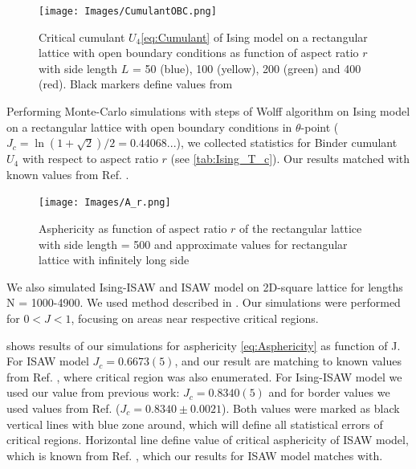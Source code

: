 \documentclass[a4paper]{jpconf}
\begin{document}
\begin{figure}[h]
    \centering
    \texttt{[image: Images/CumulantOBC.png]}
    \caption{Critical cumulant $U_{4}$\eqref{eq:Cumulant} of Ising model on a rectangular lattice with open boundary conditions as function of aspect ratio $r$ with side length $L$ = 50 (blue), 100 (yellow), 200 (green) and 400 (red). Black markers define values from \cite{Selke2006}}
    \label{fig:A_r}
\end{figure}

Performing Monte-Carlo simulations with steps of Wolff algorithm \cite{Newmanb1999} on Ising model on a rectangular lattice with open boundary conditions in $\theta$-point ($J_{c} = \ln{(1 + \sqrt{2}) / 2} =  0.44068... $), we collected statistics for Binder cumulant $U_{4}$ with respect to aspect ratio $r$ (see \cref{tab:Ising_T_c}). Our results matched with known values from Ref. \cite{Selke2006}.

\begin{figure}[h]
    \centering
    \texttt{[image: Images/A\_r.png]}
    \caption{Asphericity as function of aspect ratio $r$ of the rectangular lattice with side length = 500 and approximate values for rectangular lattice with infinitely long side}
    \label{fig:A_r}
\end{figure}


We also simulated Ising-ISAW and ISAW model on 2D-square lattice for lengths N = 1000-4900.  
We used method described in \cite{faizullina2021critical}. 
Our simulations were performed for $0 < J < 1$, focusing on areas near respective critical regions.

 shows results of our simulations for asphericity \eqref{eq:Asphericity} as function of J. 
For ISAW model $J_{c} = 0.6673(5)$, and our result are matching to known values from  Ref. \cite{Caracciolo2011}, where critical region was also enumerated.
For Ising-ISAW model we used our value from previous work: $J_{c} = 0.8340(5)$ \cite{faizullina2021critical} and for border values we used values from Ref.\cite{Foster2021} ($J_{c} = 0.8340 \pm 0.0021$). 
Both values were marked as black vertical lines with blue zone around, which will define all statistical errors of critical regions. 
Horizontal line define value of critical asphericity of ISAW model, which is known from Ref. \cite{Caracciolo2011}, which our results for ISAW model matches with.
\end{document}
